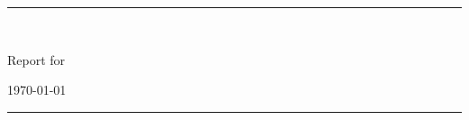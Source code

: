 \fancyhead[C]{}
\hrule \medskip
\begin{minipage}{0.295\textwidth} 
\raggedright
\footnotesize
\yourname \hfill\\
\youremail
\end{minipage}
\begin{minipage}{0.4\textwidth} 
\centering 
\large 
Report for \assignmentnumber\\ 
\normalsize 

\end{minipage}
\begin{minipage}{0.295\textwidth} 
\raggedleft
\today\hfill\\
\end{minipage}
\medskip\hrule 
\bigskip

